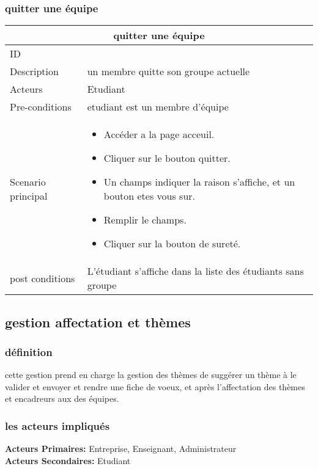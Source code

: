 \documentclass[11pt,fleqn]{book} %
\begin{document}
\subsubsection{quitter une équipe}
\begin{center}
\begin{tabularx}{1\textwidth} { | p{4cm} | >{\raggedright\arraybackslash}X |  }
  \hline
  \multicolumn{2}{|c|}{quitter une équipe} \\
 \hline
 ID & 6  \\
 \hline
 Description  & un membre quitte son groupe actuelle\\
  \hline
 Acteurs  & Etudiant   \\
  \hline
 Pre-conditions  & etudiant est un membre d'équipe\\
 \hline
 Scenario principal  &  
 \begin{itemize}
     \item  Accéder a la page acceuil.
     \item Cliquer sur le bouton quitter.
     \item Un champs indiquer la raison s’affiche, et un bouton etes vous sur.
     \item Remplir le champs.
     \item Cliquer sur la bouton de sureté.
 \end{itemize}\\
  \hline
 post conditions  &   L’étudiant s’affiche dans la liste des étudiants sans groupe  \\
  \hline
\end{tabularx}
\label{tbl:nicetablelesstable}
\end{center}

\newpage
\subsection{gestion affectation et thèmes }
\subsubsection{définition}
cette gestion prend en charge la gestion des thèmes de suggérer un thème à le valider et envoyer et rendre une fiche de voeux, et après l'affectation des thèmes et encadreurs aux des équipes.
\subsubsection{les acteurs impliqués}
\textbf{Acteurs Primaires:} Entreprise, Enseignant, Administrateur \\
\textbf{Acteurs Secondaires:} Etudiant
\end{document}
